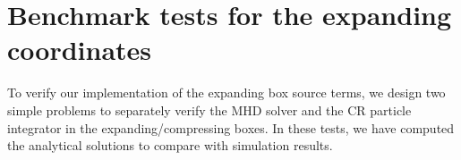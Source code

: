 \documentclass[fleqn,usenatbib]{mnras}
\begin{document}



\appendix

\section{Benchmark tests for the expanding coordinates}
\label{app::test_expanding}


To verify our implementation of the expanding box source terms, we design two simple problems to separately verify the MHD solver and the CR particle integrator in the expanding/compressing boxes. In these tests, we have computed the analytical solutions to compare with simulation results.
\end{document}
